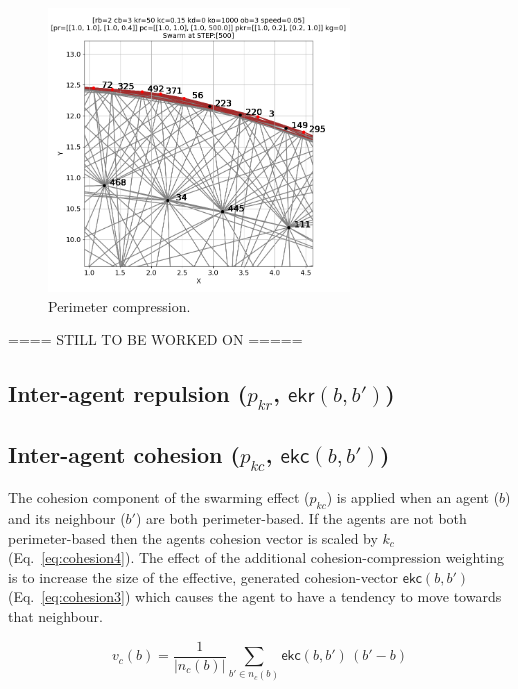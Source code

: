\documentclass[12pt,a4paper]{IEEEtran}
\newcommand{\magn}[1]{\Vert{#1}\Vert}
\newcommand{\vbb}[2]{#2-#1}
\begin{document}
\begin{figure}[H]
	\begin{center}
		\includegraphics[width=8cm]{figures/perimeterCompress}
	\end{center}
	\caption{Perimeter compression. \label{fig:perimeterCompression}}
\end{figure}


==== STILL TO BE WORKED ON =====

\subsection{Inter-agent repulsion ($p_{kr}$, $\mathsf{ekr}(b,b')$)}

\subsection{Inter-agent cohesion ($p_{kc}$, $\mathsf{ekc}(b,b')$)}

The cohesion component of the swarming effect ($p_{kc}$) is applied when an agent ($b$) and its neighbour ($b'$) are both perimeter-based. If the agents are not both perimeter-based then the agents cohesion vector is scaled by $k_c$ (Eq.~\ref{eq:cohesion4}). The effect of the additional cohesion-compression weighting is to increase the size of the effective, generated cohesion-vector $\mathsf{ekc}(b,b')$ (Eq.~\ref{eq:cohesion3}) which causes the agent to have a tendency to move towards that neighbour. 

\begin{equation}\label{eq:cohesion3}
v_c(b) = \frac{1}{\lvert n_c(b)\rvert} \sum_{b' \in n_c(b)}\mathsf{ekc}(b, b')\, \left(\vbb{b}{b'}\right)
\end{equation}
\end{document}
